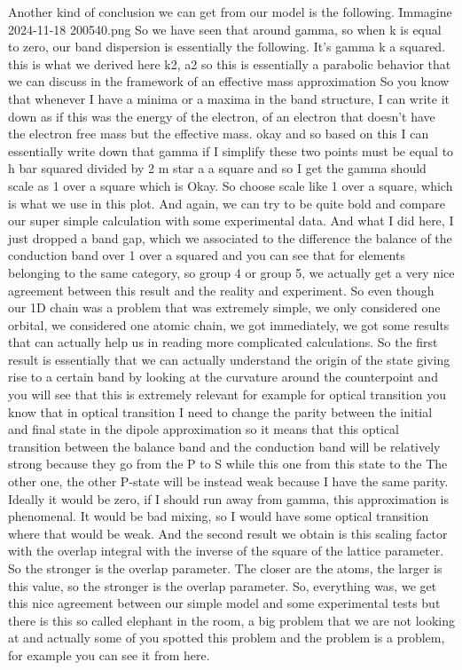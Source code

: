 Another kind of conclusion we can get from our model is the following.
\f{Immagine 2024-11-18 200540.png}
So we have seen that around gamma, so when k is equal to zero, our band dispersion is essentially the following. It's gamma k a squared. this is what we derived here k2, a2 so this is essentially a parabolic behavior that we can discuss in the framework of an effective mass approximation So you know that whenever I have a minima or a maxima in the band structure, I can write it down as if this was the energy of the electron, of an electron that doesn't have the electron free mass but the effective mass. okay and so based on this I can essentially write down that gamma if I simplify these two points must be equal to h bar squared divided by 2 m star a a square and so I get the gamma should scale as 1 over a square which is Okay. So choose scale like 1 over a square, which is what we use in this plot. And again, we can try to be quite bold and compare our super simple calculation with some experimental data. And what I did here, I just dropped a band gap, which we associated to the difference the balance of the conduction band over 1 over a squared and you can see that for elements belonging to the same category, so group 4 or group 5, we actually get a very nice agreement between this result and the reality and experiment. So even though our 1D chain was a problem that was extremely simple, we only considered one orbital, we considered one atomic chain, we got immediately, we got some results that can actually help us in reading more complicated calculations. So the first result is essentially that we can actually understand the origin of the state giving rise to a certain band by looking at the curvature around the counterpoint and you will see that this is extremely relevant for example for optical transition you know that in optical transition I need to change the parity between the initial and final state in the dipole approximation so it means that this optical transition between the balance band and the conduction band will be relatively strong because they go from the P to S while this one from this state to the The other one, the other P-state will be instead weak because I have the same parity. Ideally it would be zero, if I should run away from gamma, this approximation is phenomenal. It would be bad mixing, so I would have some optical transition where that would be weak. And the second result we obtain is this scaling factor with the overlap integral with the inverse of the square of the lattice parameter. So the stronger is the overlap parameter. The closer are the atoms, the larger is this value, so the stronger is the overlap parameter. So, everything was, we get this nice agreement between our simple model and some experimental tests but there is this so called elephant in the room, a big problem that we are not looking at and actually some of you spotted this problem and the problem is a problem, for example you can see it from here.
